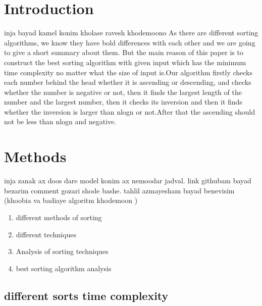 \documentclass[
10pt, %
a4paper, %
oneside, %
headinclude,footinclude, %
BCOR5mm, %
]{scrartcl}
\begin{document}
\let\thefootnote\relax{}


\newpage 
\section{Introduction}
inja bayad kamel konim kholase ravesh khodemoono
As there are different sorting algorithms, we know they have  
bold differences with each other and we are going to give a short summary about them. But the main reason of this paper is to construct the best sorting algorithm with given input which has the minimum time complexity no matter what the size of input is.Our algorithm firstly checks each number behind the head whether it is ascending or descending, and checks whether the number is negative or not, then it finds the largest length of the number and the largest number, then it checks its inversion and then it finds whether the inversion is larger than nlogn or not.After that the ascending should not be less than nlogn and negative.

\section{Methods}

inja zanak ax doos dare model konim ax nemoodar jadval. link githubam bayad bezarim comment gozari shode bashe.
tahlil azmayesham bayad benevisim (khoobia va badiaye algoritm khodemoon )
\begin{enumerate}[noitemsep]
\item different methods of sorting
\item different techniques
\item Analysis of sorting techniques 
\item best sorting algorithm analysis
\end{enumerate}


\subsection{different sorts time complexity}
\end{document}

